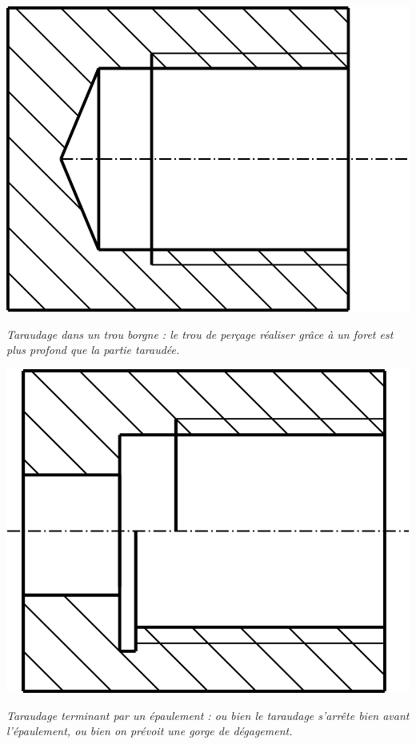 \documentclass[11pt,oneside]{article}
\begin{document}
\noindent\begin{minipage}[c]{.3\linewidth}
\begin{center}
\includegraphics[width=.8\textwidth]{png/taraudage_lisse}
\end{center}

\noindent\textit{Taraudage dans un trou borgne : le trou de perçage réaliser grâce à un foret est plus profond que la partie taraudée.}
\end{minipage}\hfill
\begin{minipage}[c]{.3\linewidth}
\begin{center}
\includegraphics[width=.8\textwidth]{png/taraudage_epaul}
\end{center}

\noindent\textit{Taraudage terminant par un épaulement : ou bien le taraudage s'arrête bien avant l'épaulement, ou bien on prévoit une gorge de dégagement.}
\end{minipage}\hfill
\end{document}

